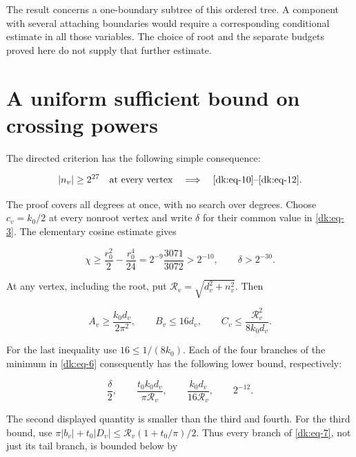 The result concerns a one-boundary subtree of this ordered tree.
A component with several attaching boundaries would require a
corresponding conditional estimate in all those variables. The choice
of root and the separate budgets proved here do not supply that further
estimate.

\section{A uniform sufficient bound on crossing powers}\label{dk:sec-8}

The directed criterion has the following simple consequence:

\begin{equation}\label{dk:eq-47}
|n_v|\ge2^{27}\quad\text{at every vertex}
             \quad\Longrightarrow\quad
             \eqref{dk:eq-10}\text{--}\eqref{dk:eq-12}.
\end{equation}

The proof covers all degrees at once, with no search over degrees.
Choose \(c_v=k_0/2\) at every nonroot vertex
and write \(\delta\) for their common value in \eqref{dk:eq-3}. The elementary
cosine estimate gives

\begin{equation}\label{dk:eq-48}
\chi\ge\frac{r_0^2}{2}-\frac{r_0^4}{24}
       =2^{-9}\frac{3071}{3072}>2^{-10},\qquad
                          \delta>2^{-30}.
\end{equation}

At any vertex, including the root, put
\(\mathcal R_v=\sqrt{d_v^2+n_v^2}\). Then

\begin{equation}\label{dk:eq-49}
A_v\ge\frac{k_0d_v}{2\pi^2},\qquad B_v\le16d_v,
 \qquad C_v\le\frac{\mathcal R_v^2}{8k_0d_v}.
\end{equation}

For the last inequality use \(16\le1/(8k_0)\). Each of the four
branches of the minimum in \eqref{dk:eq-6} consequently has the following lower
bound, respectively:

\begin{equation}\label{dk:eq-50}
\frac\delta2,\qquad
 \frac{t_0k_0d_v}{\pi\mathcal R_v},\qquad
 \frac{k_0d_v}{16\mathcal R_v},\qquad 2^{-12}.
\end{equation}

The second displayed quantity is smaller than the third and fourth.
For the third bound, use
\(\pi|b_v|+t_0|D_v|\le\mathcal R_v(1+t_0/\pi)/2\).
Thus every branch of \eqref{dk:eq-7}, not just its tail branch, is bounded below by

